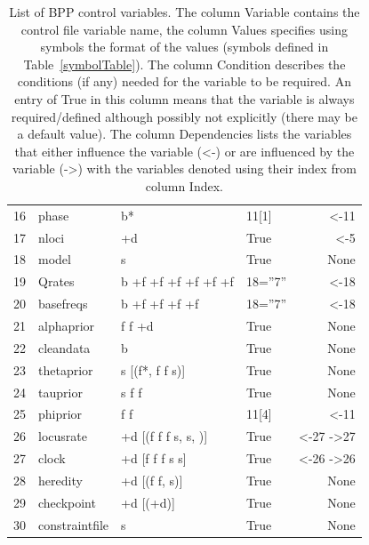 \documentclass[a4paper]{book}
\numberwithin{equation}{section} \renewcommand{\baselinestretch}{0.55}
\begin{document}
\begin{table}[h]
\begin{center}
{\begin{tabular}{@{}llllr@{}}
      16 & {\color{green1} phase} & b* & 11[1] & <-11 \\
      17 & {\color{blue} nloci} & +d & True & <-5 \\
      18 & {\color{blue} model} & s & True & None \\
      19 & {\color{blue} Qrates} & b +f +f +f +f +f +f & 18=''7'' & <-18 \\
      20 & {\color{blue} basefreqs} & b +f +f +f +f & 18=''7'' & <-18 \\
      21 & {\color{blue} alphaprior} & f f +d & True & None \\
      22 & {\color{blue} cleandata} & b & True & None \\
      23 & {\color{red} thetaprior} & s [(f*, f f s)] & True & None \\
      24 & {\color{red} tauprior} & s f f & True & None \\
      25 & {\color{yellow1} phiprior} & f f & 11[4] & <-11 \\
      26 & {\color{blue} locusrate} & +d [(f f f s, s, )] & True & <-27 ->27 \\
      27 & {\color{blue} clock} & +d [f f f s s] & True & <-26 ->26 \\
      28 & {\color{blue} heredity} & +d [(f f, s)] & True & None \\
      29 & {\color{blue} checkpoint} & +d [(+d)] & True & None \\
      30 & {\color{blue} constraintfile} & s & True & None \\
      \bottomrule
    \end{tabular}
    }
    \caption{List of BPP control variables. The column Variable
      contains the control file variable name, the column Values
      specifies using symbols the format of the values (symbols
      defined in Table~\ref{symbolTable}). The column Condition
      describes the conditions (if any) needed for the variable to be
      required. An entry of True in this column means that the
      variable is always required/defined although possibly not
      explicitly (there may be a default value). The column
      Dependencies lists the variables that either influence the
      variable (<-) or are influenced by the variable (->) with the
      variables denoted using their index from column Index.}
    \label{variableTable}
  \end{center}
\end{table}
\end{document}
